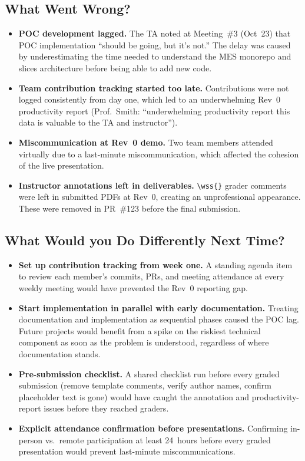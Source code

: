 \documentclass{article}
\begin{document}
\subsection{What Went Wrong?}

\begin{itemize}
  \item \textbf{POC development lagged.}  The TA noted at Meeting~\#3
    (Oct~23) that POC implementation ``should be going, but it's not.''
    The delay was caused by underestimating the time needed to understand
    the MES monorepo and slices architecture before being able to add new
    code.
  \item \textbf{Team contribution tracking started too late.}
    Contributions were not logged consistently from day one, which led to
    an underwhelming Rev~0 productivity report (Prof.\ Smith:
    ``underwhelming productivity report this data is valuable to the TA
    and instructor'').
  \item \textbf{Miscommunication at Rev~0 demo.}  Two team members
    attended virtually due to a last-minute miscommunication, which
    affected the cohesion of the live presentation.
  \item \textbf{Instructor annotations left in deliverables.}
    \texttt{\textbackslash wss\{\}} grader comments were left in submitted
    PDFs at Rev~0, creating an unprofessional appearance.  These were
    removed in PR~\#123 before the final submission.
\end{itemize}

\subsection{What Would you Do Differently Next Time?}

\begin{itemize}
  \item \textbf{Set up contribution tracking from week one.}  A standing
    agenda item to review each member's commits, PRs, and meeting
    attendance at every weekly meeting would have prevented the Rev~0
    reporting gap.
  \item \textbf{Start implementation in parallel with early documentation.}
    Treating documentation and implementation as sequential phases caused
    the POC lag.  Future projects would benefit from a spike on the riskiest
    technical component as soon as the problem is understood, regardless of
    where documentation stands.
  \item \textbf{Pre-submission checklist.}  A shared checklist run before
    every graded submission (remove template comments, verify author names,
    confirm placeholder text is gone) would have caught the annotation and
    productivity-report issues before they reached graders.
  \item \textbf{Explicit attendance confirmation before presentations.}
    Confirming in-person vs.\ remote participation at least 24~hours
    before every graded presentation would prevent last-minute
    miscommunications.
\end{itemize}
\end{document}
